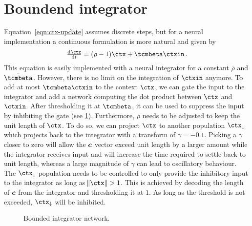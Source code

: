 \section{Boundend integrator}
Equation~\ref{eqn:ctx-update} assumes discrete steps, but for a neural implementation a continuous formulation is more natural and given by
\begin{equation}
    \od{\ctx}{t} = (\bar{\rho} - 1) \ctx + \bar{\tcmbeta} \ctxin\,\text{.}
\end{equation}
This equation is easily implemented with a neural integrator for a constant $\bar{\rho}$ and $\bar{\tcmbeta}$.
However, there is no limit on the integration of $\ctxin$ anymore.
To add at most $\tcmbeta \ctxin$ to the context $\ctx$, we can gate the input to the integrator and add a network computing the dot product between $\ctx$ and $\ctxin$.
After thresholding it at $\tcmbeta$, it can be used to suppress the input by inhibiting the gate (see \cref{fig:ctx-bounded-integrator}).
Furthermore, $\bar{\rho}$ needs to be adjusted to keep the unit length of $\ctx$.
To do so, we can project $\ctx$ to another population $\ctx_{\downarrow}$ which projects back to the integrator with a transform of $\gamma = -0.1$.
Picking a $\gamma$ closer to zero will allow the $\bm{c}$ vector exceed unit length by a larger amount while the integrator receives input and will increase the time required to settle back to unit length, whereas a large magnitude of $\gamma$ can lead to oscillatory behaviour.
The $\ctx_{\downarrow}$ population needs to be controlled to only provide the inhibitory input to the integrator as long as $\norm{\ctx} > 1$.
This is achieved by decoding the length of $\bm{c}$ from the integrator and thresholding it at $1$.
As long as the threshold is not exceeded, $\ctx_{\downarrow}$ will be inhibited.
\begin{figure}
    \centering
    \caption{Bounded integrator network.}\label{fig:ctx-bounded-integrator}
\end{figure}

